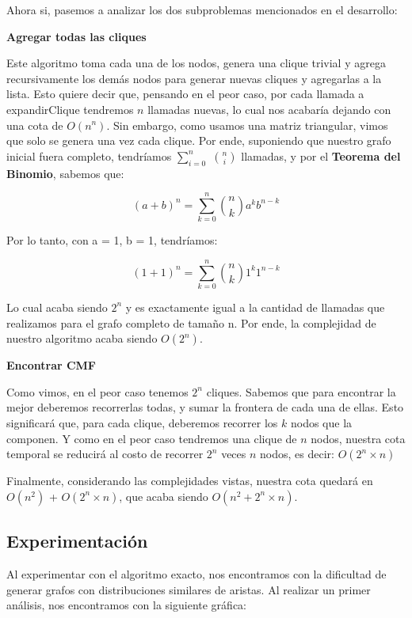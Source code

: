 Ahora si, pasemos a analizar los dos subproblemas mencionados en el desarrollo:

\begin{center}
	\textbf{Agregar todas las cliques}
\end{center}
Este algoritmo toma cada una de los nodos, genera una clique trivial y agrega recursivamente los demás nodos para generar nuevas cliques y agregarlas a la lista. Esto quiere decir que, pensando en el peor caso, por cada llamada a expandirClique tendremos $n$ llamadas nuevas, lo cual nos acabaría dejando con una cota de $O(n^n)$. Sin embargo, como usamos una matriz triangular, vimos que solo se genera una vez cada clique. Por ende, suponiendo que nuestro grafo inicial fuera completo, tendríamos $\sum_{i=0}^{n}$ ${n \choose i}$ llamadas, y por el \textbf{Teorema del Binomio}, sabemos que:
\begin{center}
 $$(a+b)^{n}  = \sum_{k=0}^{n} \binom{n}{k} a^{k}b^{n-k}$$
\end{center}
Por lo tanto, con a = 1, b = 1, tendríamos:
\begin{center}
 $$(1+1)^{n}  = \sum_{k=0}^{n} \binom{n}{k} 1^{k}1^{n-k}$$
\end{center}
Lo cual acaba siendo $2^n$ y es exactamente igual a la cantidad de llamadas que realizamos para el grafo completo de tamaño n. Por ende, la complejidad de nuestro algoritmo acaba siendo $O(2^n)$.

\begin{center}
	\textbf{Encontrar CMF}
\end{center}
Como vimos, en el peor caso tenemos $2^n$ cliques. Sabemos que para encontrar la mejor deberemos recorrerlas todas, y sumar la frontera de cada una de ellas. Esto significará que, para cada clique, deberemos recorrer los $k$ nodos que la componen. Y como en el peor caso tendremos una clique de $n$ nodos, nuestra cota temporal se reducirá al costo de recorrer $2^n$ veces $n$ nodos, es decir: $O(2^n\times n)$
\bigskip

Finalmente, considerando las complejidades vistas, nuestra cota quedará en $O(n^2)$ + $O(2^n \times n)$, que acaba siendo $O(n^2 + 2^n\times n)$.


\subsection{Experimentación}

Al experimentar con el algoritmo exacto, nos encontramos con la dificultad de generar grafos con distribuciones similares de aristas. Al realizar un primer análisis, nos encontramos con la siguiente gráfica:

